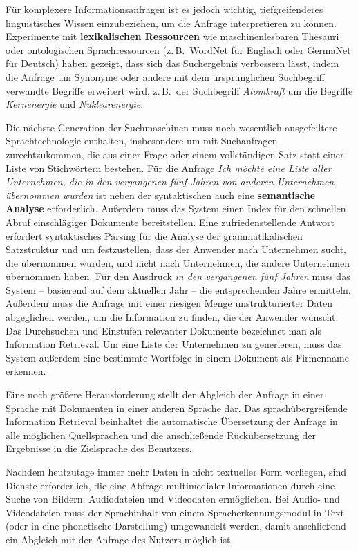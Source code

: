 \documentclass[]{../../metanetpaper}
\begin{document}
\begin{multicols}{2}
Für komplexere Informationsanfragen ist es jedoch wichtig, tiefgreifenderes linguistisches Wissen einzubeziehen, um die Anfrage interpretieren zu können. Experimente mit \textbf{lexikalischen Ressourcen} wie maschinenlesbaren Thesauri oder ontologischen Sprachressourcen (z.\,B.~WordNet für Englisch oder GermaNet für Deutsch) haben gezeigt, dass sich das Suchergebnis verbessern lässt, indem die Anfrage um Synonyme oder andere mit dem ursprünglichen Suchbegriff verwandte Begriffe erweitert wird, z.\,B.~der Suchbegriff \textit{Atomkraft} um die Begriffe \textit{Kernenergie} und \textit{Nuklearenergie}. 

Die nächste Generation der Suchmaschinen muss noch wesentlich ausgefeiltere Sprachtechnologie enthalten, insbesondere um mit Suchanfragen zurechtzukommen, die aus einer Frage oder einem vollständigen Satz statt einer Liste von Stichwörtern bestehen. Für die Anfrage \textit{Ich möchte eine Liste aller Unternehmen, die in den vergangenen fünf Jahren von anderen Unternehmen übernommen wurden} ist neben der syntaktischen auch eine \textbf{semantische Analyse} erforderlich. Außerdem muss das System einen Index für den schnellen Abruf einschlägiger Dokumente bereitstellen. Eine zufriedenstellende Antwort erfordert syntaktisches Parsing für die Analyse der grammatikalischen Satzstruktur und um festzustellen, dass der Anwender nach Unternehmen sucht, die übernommen wurden, und nicht nach Unternehmen, die andere Unternehmen übernommen haben. Für den Ausdruck \textit{in den vergangenen fünf Jahren} muss das System -- basierend auf dem aktuellen Jahr -- die entsprechenden Jahre ermitteln. Außerdem muss die Anfrage mit einer riesigen Menge unstrukturierter Daten abgeglichen werden, um die Information zu finden, die der Anwender wünscht. Das Durchsuchen und Einstufen relevanter Dokumente bezeichnet man als Information Retrieval. Um eine Liste der Unternehmen zu generieren, muss das System außerdem eine bestimmte Wortfolge in einem Dokument als Firmenname erkennen.  


Eine noch größere Herausforderung stellt der Abgleich der Anfrage in einer Sprache mit Dokumenten in einer anderen Sprache dar. Das sprachübergreifende Information Retrieval beinhaltet die automatische Übersetzung der Anfrage in alle möglichen Quellsprachen und die anschließende Rückübersetzung der Ergebnisse in die Zielsprache des Benutzers. 

Nachdem heutzutage immer mehr Daten in nicht textueller Form vorliegen, sind Dienste erforderlich, die eine Abfrage multimedialer Informationen durch eine Suche von Bildern, Audiodateien und Videodaten ermöglichen. Bei Audio- und Videodateien muss der Sprachinhalt von einem Spracherkennungsmodul in Text (oder in eine phonetische Darstellung) umgewandelt werden, damit anschließend ein Abgleich mit der Anfrage des Nutzers möglich ist.


\end{multicols}
\end{document}
